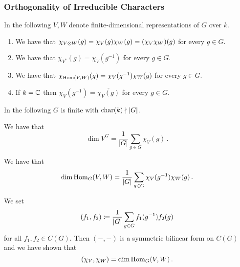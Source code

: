 \subsubsection{Orthogonality of Irreducible Characters}


\begin{conventions}
  In the following $V, W$ denote finite-dimensional representations of $G$ over $k$.
\end{conventions}

\begin{lemma}
  \label{lemma: more characters for groups}
  \leavevmode
  \begin{enumerate}
    \item
      We have that $\chi_{V \mathbin{\otimes} W}(g) = \chi_V(g) \chi_W(g) = (\chi_V \chi_W)(g)$ for every $g \in G$.
    \item
      We have that $\chi_{V^*}(g) = \chi_V(g^{-1})$ for every $g \in G$.
    \item
      We have that $\chi_{\operatorname{Hom}(V, W)}(g) = \chi_V(g^{-1}) \chi_W(g)$ for every $g \in G$.
    \item
      If $k = \mathbb{C}$ then $\chi_V(g^{-1}) = \overline{\chi_V(g)}$ for every $g \in G$.
  \end{enumerate}
\end{lemma}




\begin{conventions}
  In the following $G$ is finite with $\operatorname{char}(k) \nmid |G|$.
\end{conventions}




\begin{lemma}
  We have that
  \[
      \dim V^G
    = \frac{1}{|G|} \sum_{g \in G} \chi_V(g) \,.
  \]
\end{lemma}




\begin{corollary}
  We have that
  \[
      \dim \operatorname{Hom}_G(V,W)
    = \frac{1}{|G|} \sum_{g \in G} \chi_V(g^{-1}) \chi_W(g) \,.
  \]
\end{corollary}




\begin{fluff}
  We set
  \[
              (f_1, f_2)
    \coloneqq  \frac{1}{|G|} \sum_{g \in G} f_1(g^{-1}) f_2(g)
  \]
  for all $f_1, f_2 \in C(G)$.
  Then $(-,-)$ is a symmetric bilinear form on $C(G)$ and we have shown that
  \[
      (\chi_V, \chi_W)
    = \dim \operatorname{Hom}_G(V,W) \,.
  \]
\end{fluff}


